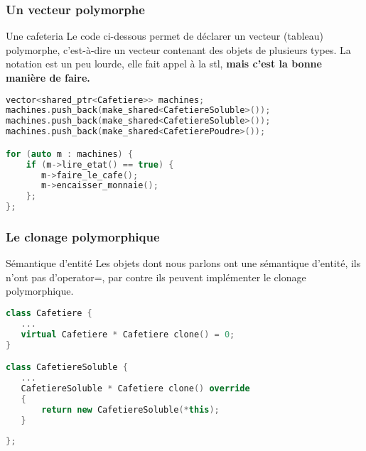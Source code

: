 \documentclass{beamer}
\begin{document}
\begin{frame}[fragile=singleslide,shrink=20]
\frametitle {Un vecteur polymorphe}

\begin{block}{Une cafeteria}
Le code ci-dessous permet de déclarer un vecteur (tableau) polymorphe, c'est-à-dire un vecteur contenant des objets de plusieurs types.
La notation est un peu lourde, elle fait appel à la stl, \bf{mais c'est la bonne manière de faire}.
\end{block}

\begin{lstlisting}[language=c++]
vector<shared_ptr<Cafetiere>> machines;
machines.push_back(make_shared<CafetiereSoluble>());
machines.push_back(make_shared<CafetiereSoluble>());
machines.push_back(make_shared<CafetierePoudre>());

for (auto m : machines) {
    if (m->lire_etat() == true) {
       m->faire_le_cafe();
       m->encaisser_monnaie();
    };
};
\end{lstlisting}
\end{frame}

\begin{frame}[fragile=singleslide,shrink=20]
\frametitle {Le clonage polymorphique}

\begin{block}{Sémantique d'entité}
Les objets dont nous parlons ont une sémantique d'entité, ils n'ont pas d'operator=, par contre ils
peuvent implémenter le clonage polymorphique.
\end{block}

\begin{lstlisting}[language=c++]
class Cafetiere {
   ...
   virtual Cafetiere * Cafetiere clone() = 0;
}

class CafetiereSoluble {
   ...
   CafetiereSoluble * Cafetiere clone() override
   {
       return new CafetiereSoluble(*this);
   }
   
};
\end{lstlisting}
\end{frame}
\end{document}
